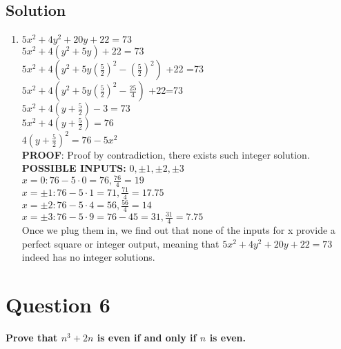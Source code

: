 \documentclass[11pt]{article}
\begin{document}
    \subsection*{Solution}
    \begin{enumerate}[label=(\alph*)]
        \item[] \(5x^2 +4y^2+20y+22=73\) \\
        \(5x^2 +4(y^2+5y)+22=73\) \\
        \(5x^2+4(y^2+5y(\frac{5}{2})^2-(\frac{5}{2})^2)\) +22 =73 \\
        \(5x^2+4(y^2+5y(\frac{5}{2})^2-\frac{25}{4})\) +22=73 \\
        \(5x^2+4(y+\frac{5}{2})-3=73\) \\
        \(5x^2+4(y+\frac{5}{2})=76\) \\
        \(4(y+\frac{5}{2})^2=76-5x^2\) \\
        \textbf{PROOF}: Proof by contradiction, there exists such integer solution. \\
        \textbf{POSSIBLE INPUTS:} \(0,\pm 1,\pm 2,\pm 3\) \\
        \(x = 0: 76 - 5 \cdot 0 = 76, \frac{76}{4} = 19\) \\
        \(x = \pm 1: 76 - 5 \cdot 1 = 71, \frac{71}{4} = 17.75\) \\
        \(x = \pm 2: 76 - 5 \cdot 4 = 56, \frac{56}{4} = 14\) \\
        \(x = \pm 3: 76 - 5 \cdot 9 = 76 - 45 = 31, \frac{31}{4} = 7.75\) \\
        Once we plug them in, we find out that none of the inputs for x provide a perfect square or integer output, meaning that \(5x^2 +4y^2+20y+22=73\) indeed has no integer solutions. \\
        
        
    \end{enumerate}
    
\clearpage
\section*{Question 6}
    \textbf{Prove that \(n^3 +2n\) is even if and only if \(n\) is even.}
\end{document}
